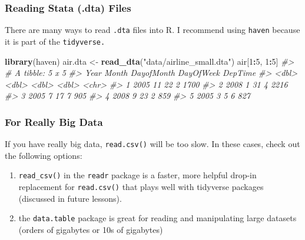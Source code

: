 \documentclass[]{book}
\newenvironment{Shaded}{\begin{snugshade}}{\end{snugshade}}
\newcommand{\KeywordTok}[1]{\textcolor[rgb]{0.13,0.29,0.53}{\textbf{#1}}}
\newcommand{\DecValTok}[1]{\textcolor[rgb]{0.00,0.00,0.81}{#1}}
\newcommand{\StringTok}[1]{\textcolor[rgb]{0.31,0.60,0.02}{#1}}
\newcommand{\CommentTok}[1]{\textcolor[rgb]{0.56,0.35,0.01}{\textit{#1}}}
\newcommand{\OperatorTok}[1]{\textcolor[rgb]{0.81,0.36,0.00}{\textbf{#1}}}
\newcommand{\NormalTok}[1]{#1}
\providecommand{\tightlist}{%
  \setlength{\itemsep}{0pt}\setlength{\parskip}{0pt}}
\begin{document}
\subsubsection*{Reading Stata (.dta)
Files}\label{reading-stata-.dta-files}

There are many ways to read \texttt{.dta} files into R. I recommend
using \texttt{haven} because it is part of the \texttt{tidyverse.}

\begin{Shaded}
\begin{Highlighting}[]
\KeywordTok{library}\NormalTok{(haven)}
\NormalTok{air.dta <-}\StringTok{ }\KeywordTok{read_dta}\NormalTok{(}\StringTok{"data/airline_small.dta"}\NormalTok{) }
\NormalTok{air[}\DecValTok{1}\OperatorTok{:}\DecValTok{5}\NormalTok{, }\DecValTok{1}\OperatorTok{:}\DecValTok{5}\NormalTok{]}
\CommentTok{#> # A tibble: 5 x 5}
\CommentTok{#>    Year Month DayofMonth DayOfWeek DepTime}
\CommentTok{#>   <dbl> <dbl>      <dbl>     <dbl> <chr>  }
\CommentTok{#> 1  2005    11         22         2 1700   }
\CommentTok{#> 2  2008     1         31         4 2216   }
\CommentTok{#> 3  2005     7         17         7 905    }
\CommentTok{#> 4  2008     9         23         2 859    }
\CommentTok{#> 5  2005     3          5         6 827}
\end{Highlighting}
\end{Shaded}

\subsubsection*{For Really Big Data}\label{for-really-big-data}

If you have really big data, \texttt{read.csv()} will be too slow. In
these cases, check out the following options:

\begin{enumerate}
\def\labelenumi{\arabic{enumi})}
\tightlist
\item
  \texttt{read\_csv()} in the \texttt{readr} package is a faster, more
  helpful drop-in replacement for \texttt{read.csv()} that plays well
  with tidyverse packages (discussed in future lessons).
\item
  the \texttt{data.table} package is great for reading and manipulating
  large datasets (orders of gigabytes or 10s of gigabytes)
\end{enumerate}
\end{document}
